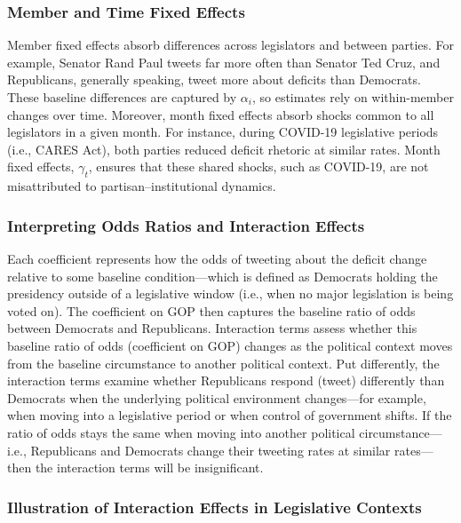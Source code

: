 \documentclass[
  12pt,
]{article}
\begin{document}
\subsubsection{Member and Time Fixed
Effects}\label{member-and-time-fixed-effects}

Member fixed effects absorb differences across legislators and between
parties. For example, Senator Rand Paul tweets far more often than
Senator Ted Cruz, and Republicans, generally speaking, tweet more about
deficits than Democrats. These baseline differences are captured by
\(\alpha_i\), so estimates rely on within-member changes over time.
Moreover, month fixed effects absorb shocks common to all legislators in
a given month. For instance, during COVID-19 legislative periods (i.e.,
CARES Act), both parties reduced deficit rhetoric at similar rates.
Month fixed effects, \(\gamma_t\), ensures that these shared shocks,
such as COVID-19, are not misattributed to partisan--institutional
dynamics.

\subsubsection{Interpreting Odds Ratios and Interaction
Effects}\label{interpreting-odds-ratios-and-interaction-effects}

Each coefficient represents how the odds of tweeting about the deficit
change relative to some baseline condition---which is defined as
Democrats holding the presidency outside of a legislative window (i.e.,
when no major legislation is being voted on). The coefficient on GOP
then captures the baseline ratio of odds between Democrats and
Republicans. Interaction terms assess whether this baseline ratio of
odds (coefficient on GOP) changes as the political context moves from
the baseline circumstance to another political context. Put differently,
the interaction terms examine whether Republicans respond (tweet)
differently than Democrats when the underlying political environment
changes---for example, when moving into a legislative period or when
control of government shifts. If the ratio of odds stays the same when
moving into another political circumstance---i.e., Republicans and
Democrats change their tweeting rates at similar rates---then the
interaction terms will be insignificant.

\subsubsection{Illustration of Interaction Effects in Legislative
Contexts}\label{illustration-of-interaction-effects-in-legislative-contexts}
\end{document}
